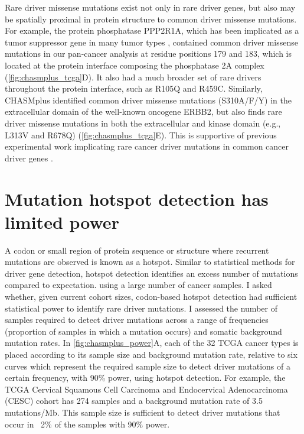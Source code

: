 Rare driver missense mutations exist not only in rare driver genes, but also may be spatially proximal in protein structure to common driver missense mutations. For example, the protein phosphatase PPP2R1A, which has been implicated as a tumor suppressor gene in many tumor types \cite{RN57}, contained common driver missense mutations in our pan-cancer analysis at residue positions 179 and 183, which is located at the protein interface composing the phosphatase 2A complex (\autoref{fig:chasmplus_tcga}D). It also had a much broader set of rare drivers throughout the protein interface, such as R105Q and R459C.  Similarly, CHASMplus identified common driver missense mutations (S310A/F/Y) in the extracellular domain of the well-known oncogene ERBB2, but also finds rare driver missense mutations in both the extracellular and kinase domain (e.g., L313V and R678Q) (\autoref{fig:chasmplus_tcga}E). This is supportive of previous experimental work implicating rare cancer driver mutations in common cancer driver genes \cite{RN4}.

\section{Mutation hotspot detection has limited power}
A codon or small region of protein sequence or structure where recurrent mutations are observed is known as a hotspot.  Similar to statistical methods for driver gene detection, hotspot detection identifies an excess number of mutations compared to expectation. using a large number of cancer samples.  I asked whether, given current cohort sizes, codon-based hotspot detection had sufficient statistical power to identify rare driver mutations.  I assessed the number of samples required to detect driver mutations across a range of frequencies (proportion of samples in which a mutation occurs) and somatic background mutation rates. In \autoref{fig:chasmplus_power}A, each of the 32 TCGA cancer types is placed according to its sample size and background mutation rate, relative to six curves which represent the required sample size to detect driver mutations of a certain frequency, with 90\% power, using hotspot detection.  For example, the TCGA Cervical Squamous Cell Carcinoma and Endocervical Adenocarcinoma (CESC) cohort has 274 samples and a background mutation rate of 3.5 mutations/Mb.  This sample size is sufficient to detect driver mutations that occur in ~2\% of the samples with 90\% power. 

